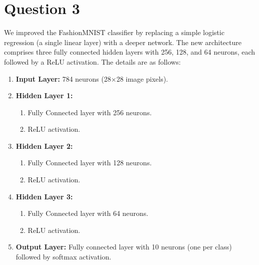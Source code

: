\documentclass{article}
\begin{document}
%  

\newpage
\section*{Question 3}

We improved the FashionMNIST classifier by replacing a simple logistic regression (a single linear layer) with a deeper network. The new architecture comprises three fully connected hidden layers with 256, 128, and 64 neurons, each followed by a ReLU activation. The details are as follows:

\begin{enumerate}
    \item \textbf{Input Layer:}  
          784 neurons (28$\times$28 image pixels).
    \item \textbf{Hidden Layer 1:}
          \begin{enumerate}
              \item Fully Connected layer with 256 neurons.
              \item ReLU activation.
          \end{enumerate}
    \item \textbf{Hidden Layer 2:}
          \begin{enumerate}
              \item Fully Connected layer with 128 neurons.
              \item ReLU activation.
          \end{enumerate}
    \item \textbf{Hidden Layer 3:}
          \begin{enumerate}
              \item Fully Connected layer with 64 neurons.
              \item ReLU activation.
          \end{enumerate}
    \item \textbf{Output Layer:}  
          Fully connected layer with 10 neurons (one per class) followed by softmax activation.
\end{enumerate}
\end{document}
